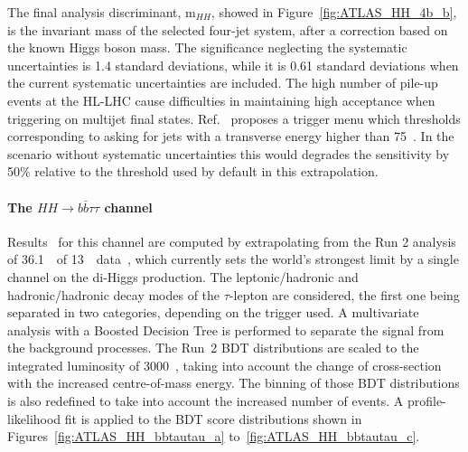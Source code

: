 The final analysis discriminant, m$_{HH}$, showed in Figure~\ref{fig:ATLAS_HH_4b_b}, is the invariant mass of the selected four-jet system, after a correction based on the known Higgs boson mass. The significance neglecting the systematic uncertainties is 1.4 standard deviations, while it is 0.61 standard deviations when the current systematic uncertainties are included. 
The high number of pile-up events at the HL-LHC cause difficulties in maintaining high acceptance when triggering on multijet final states. Ref.~\cite{Collaboration:2285584} proposes a trigger menu which thresholds corresponding to asking for jets with a transverse energy higher than 75~\GeV. In the scenario without systematic uncertainties this would degrades the sensitivity by 50\% relative to the threshold used by default in this extrapolation.


%
\paragraph{The $HH \rightarrow b\bar{b}\tau\tau$ channel}

Results~\cite{ATLASHHPUBnote} for this channel are computed by extrapolating from the Run 2 analysis of 36.1~\fbinv\ of 13~\TeV\ data~\cite{ATLASrun2HHbbtautau}, which currently sets the world's strongest limit by a single channel on the di-Higgs production. 
The leptonic/hadronic and hadronic/hadronic decay modes of the $\tau$-lepton are considered, the first one being separated in two categories, depending on the trigger used. A multivariate analysis with a Boosted Decision Tree is performed to separate the signal from the background processes. The Run~2 BDT distributions are scaled to the integrated luminosity of 3000~\fbinv, taking into account the change of cross-section with the increased centre-of-mass energy. The binning of those BDT distributions is also redefined to take into account the increased number of events.
A profile-likelihood fit is applied to the BDT score distributions shown in Figures~\ref{fig:ATLAS_HH_bbtautau_a} to~\ref{fig:ATLAS_HH_bbtautau_c}. 


